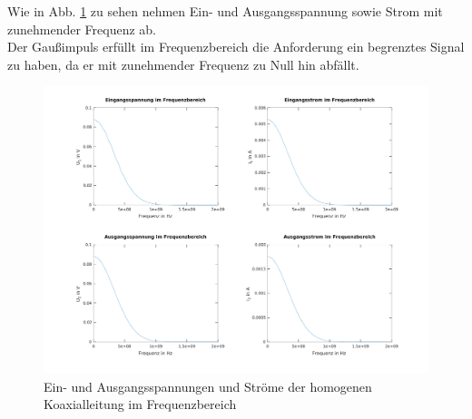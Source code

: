 \documentclass[Protokollheft.tex]{subfiles}
\begin{document}
\noindent
Wie in Abb. \ref{fig:einausspanstromfrequenz} zu sehen nehmen Ein- und Ausgangsspannung sowie Strom mit zunehmender Frequenz ab. \\
Der Gaußimpuls erfüllt im Frequenzbereich die Anforderung ein begrenztes Signal zu haben, da er mit zunehmender Frequenz zu Null hin abfällt. 
\begin{figure}
	\centering
	\includegraphics[width=0.9\linewidth]{EinAusSpanStromFrequenz}
	\caption{Ein- und Ausgangsspannungen  und Ströme der homogenen Koaxialleitung im Frequenzbereich}
	\label{fig:einausspanstromfrequenz}
\end{figure}
\end{document}
